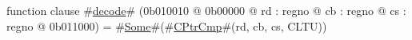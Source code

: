 function clause #\hyperref[zdecode]{decode}# (0b010010 @ 0b00000 @ rd : regno @ cb : regno @ cs : regno @ 0b011000) = #\hyperref[zSome]{Some}#(#\hyperref[zCPtrCmp]{CPtrCmp}#(rd, cb, cs, CLTU))

